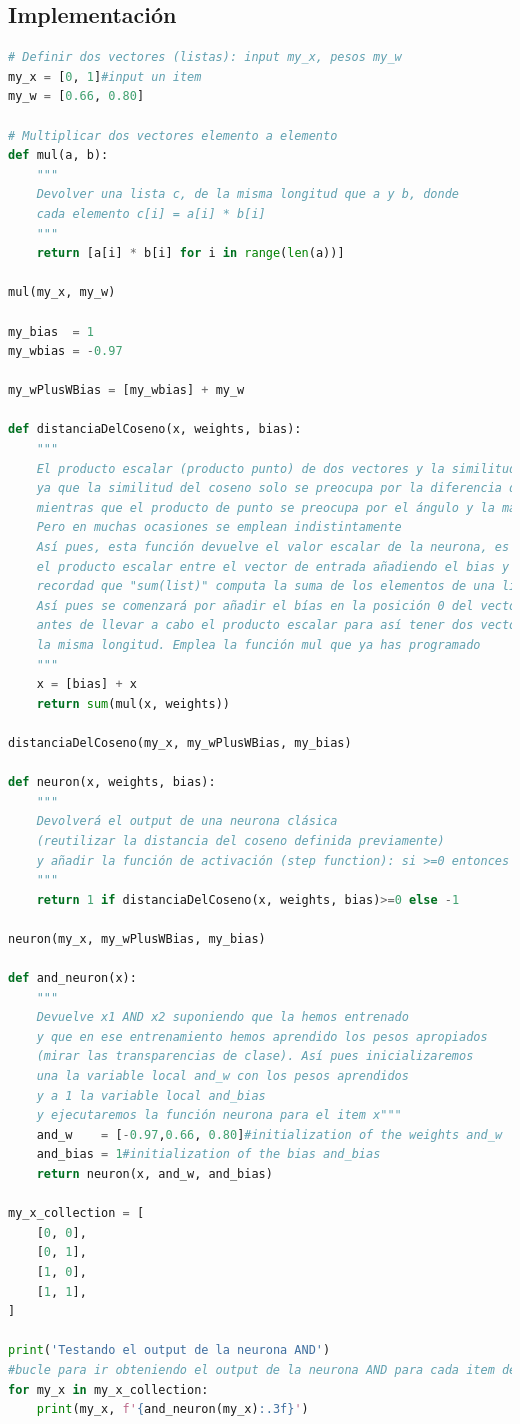 \documentclass{report}
\begin{document}
      \subsection*{Implementación}
        \begin{lstlisting}[language=Python, caption=Implementación del perceptron para las puerta lógica AND]
# Definir dos vectores (listas): input my_x, pesos my_w
my_x = [0, 1]#input un item
my_w = [0.66, 0.80]

# Multiplicar dos vectores elemento a elemento
def mul(a, b):
    """
    Devolver una lista c, de la misma longitud que a y b, donde 
    cada elemento c[i] = a[i] * b[i]
    """
    return [a[i] * b[i] for i in range(len(a))]

mul(my_x, my_w)

my_bias  = 1
my_wbias = -0.97

my_wPlusWBias = [my_wbias] + my_w

def distanciaDelCoseno(x, weights, bias):
    """
    El producto escalar (producto punto) de dos vectores y la similitud de coseno no son completamente equivalentes 
    ya que la similitud del coseno solo se preocupa por la diferencia de ángulo, 
    mientras que el producto de punto se preocupa por el ángulo y la magnitud
    Pero en muchas ocasiones se emplean indistintamente
    Así pues, esta función devuelve el valor escalar de la neurona, es decir, 
    el producto escalar entre el vector de entrada añadiendo el bias y el vector de los pesos
    recordad que "sum(list)" computa la suma de los elementos de una lista
    Así pues se comenzará por añadir el bías en la posición 0 del vector de entrada 
    antes de llevar a cabo el producto escalar para así tener dos vectores de 
    la misma longitud. Emplea la función mul que ya has programado
    """
    x = [bias] + x
    return sum(mul(x, weights))

distanciaDelCoseno(my_x, my_wPlusWBias, my_bias)

def neuron(x, weights, bias):
    """
    Devolverá el output de una neurona clásica 
    (reutilizar la distancia del coseno definida previamente) 
    y añadir la función de activación (step function): si >=0 entonces 1 sino -1
    """
    return 1 if distanciaDelCoseno(x, weights, bias)>=0 else -1

neuron(my_x, my_wPlusWBias, my_bias)

def and_neuron(x):
    """
    Devuelve x1 AND x2 suponiendo que la hemos entrenado
    y que en ese entrenamiento hemos aprendido los pesos apropiados 
    (mirar las transparencias de clase). Así pues inicializaremos 
    una la variable local and_w con los pesos aprendidos 
    y a 1 la variable local and_bias 
    y ejecutaremos la función neurona para el item x"""
    and_w    = [-0.97,0.66, 0.80]#initialization of the weights and_w
    and_bias = 1#initialization of the bias and_bias
    return neuron(x, and_w, and_bias)

my_x_collection = [
    [0, 0],
    [0, 1],
    [1, 0],
    [1, 1],
]

print('Testando el output de la neurona AND')
#bucle para ir obteniendo el output de la neurona AND para cada item del input
for my_x in my_x_collection:
    print(my_x, f'{and_neuron(my_x):.3f}')
        \end{lstlisting}
\end{document}
